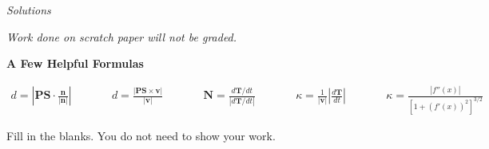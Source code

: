\begin{center}
\ifnum {} {\Large {\color{DarkBlue}\textit{Solutions}}\\[6pt]}\fi
{\Large \TestName}
\end{center}

\begin{center}

\textit{Work done on scratch paper will not be graded.}

\vspace{12pt}

\textbf{A Few Helpful Formulas}

\vspace{6pt}

$
\begin{array}{lllllllll}
    \displaystyle d = \left| \mathbf{PS}\cdot \frac{ \mathbf n}{|\mathbf n|}\right| 
    & \qquad  
    & \displaystyle d = \frac{|\mathbf{PS}\times \mathbf v|}{|\mathbf v|}  
    & \qquad
    & \displaystyle \mathbf N = \frac{d\mathbf T/dt}{\left| d\mathbf T/dt \right|}  
    & \qquad
    & \displaystyle \kappa = \frac{1}{|\mathbf v|}\left| \frac{d\mathbf T}{dt}\right|  
    & \qquad
    & \displaystyle \kappa = \frac{|f''(x)|}{\left[ 1+ (f'(x))^2\right]^{3/2}}
\end{array} 
$
\end{center}
\begin{questions}
\question[0.5] \ID

\question[7] Fill in the blanks. You do not need to show your work. 
    
    \begin{parts}
        
        
        
        
        
           
           
    \end{parts}

\newpage \question[0.25] \ID


\newpage \question[0.25] \ID


\end{questions}